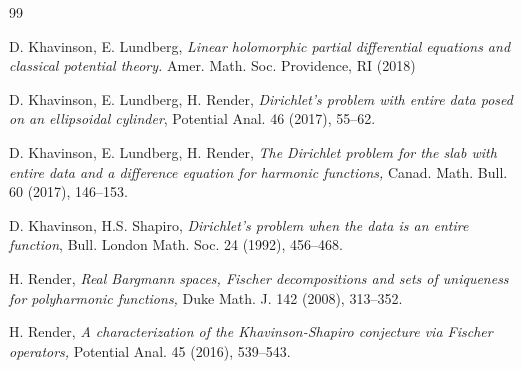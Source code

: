 \documentclass[12pt]{amsart}
\begin{document}
\begin{thebibliography}{99}
	
	
	 D. Khavinson,  E. Lundberg, \emph{Linear holomorphic partial
		differential equations and classical potential theory.} Amer. Math. Soc.
	Providence, RI (2018)
	
	
	
	
	 D. Khavinson, E. Lundberg, H. Render, \emph{Dirichlet's
		problem with entire data posed on an ellipsoidal cylinder}, Potential Anal.
	46 (2017), 55--62.
	
	 D. Khavinson, E. Lundberg, H. Render, \emph{The Dirichlet
		problem for the slab with entire data and a difference equation for harmonic
		functions, }Canad. Math. Bull. 60 (2017), 146--153.
		

 D. Khavinson, H.S. Shapiro, \emph{Dirichlet's problem when
	the data is an entire function}, Bull. London Math. Soc. 24 (1992), 456--468.
	
	

	
	
	
	
	 H. Render, \emph{Real Bargmann spaces, Fischer
		decompositions and sets of uniqueness for polyharmonic functions,} Duke
	Math. J. 142 (2008), 313--352.
	
	 H. Render, \emph{A characterization of the
	Khavinson-Shapiro conjecture via Fischer operators,} Potential Anal. 45
	(2016), 539--543.
	
	

\end{thebibliography}
\end{document}
